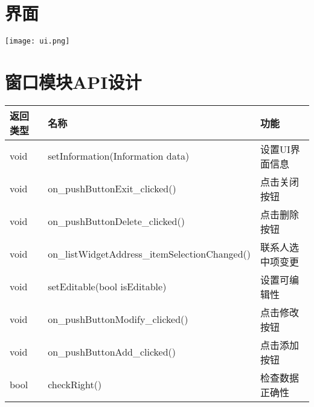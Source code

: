 \section{界面}
	\texttt{[image: ui.png]}
\section{窗口模块API设计}
	\begin{tabular}{|l|l|l|}
	    \hline
	    返回类型 & 名称 & 功能 \\
	    \hline
	    void & setInformation(Information data) & 设置UI界面信息 \\
	    void & on\_pushButtonExit\_clicked() & 点击关闭按钮 \\
	    void & on\_pushButtonDelete\_clicked() & 点击删除按钮 \\
	    void & on\_listWidgetAddress\_itemSelectionChanged() & 联系人选中项变更 \\
	    void & setEditable(bool isEditable) & 设置可编辑性 \\
	    void & on\_pushButtonModify\_clicked() & 点击修改按钮 \\
	    void & on\_pushButtonAdd\_clicked() & 点击添加按钮 \\
	    bool & checkRight() & 检查数据正确性 \\
	    \hline
	\end{tabular}